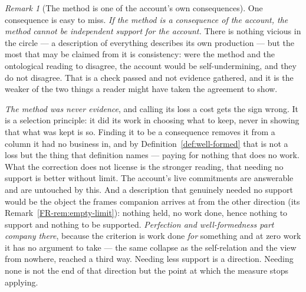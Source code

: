 \documentclass[11pt,a4paper]{article}
\theoremstyle{remark}\newtheorem{remark}[definition]{Remark}
\begin{document}
\begin{remark}[The method is one of the account's own consequences]
One consequence is easy to miss. \emph{If the method is a consequence of the account, the method cannot
be independent support for the account.} There is nothing vicious in the circle --- a description of
everything describes its own production --- but the most that may be claimed from it is consistency:
were the method and the ontological reading to disagree, the account would be self-undermining, and
they do not disagree. That is a check passed and not evidence gathered, and it is the weaker of the two
things a reader might have taken the agreement to show.

\emph{The method was never evidence}, and calling its loss a cost gets the sign wrong. It is a selection principle: it did its work in choosing what to keep, never in showing that
what was kept is so. Finding it to be a consequence removes it from a column it had no business in, and
by Definition~\ref{def:well-formed} that is not a loss but the thing that definition names --- paying
for nothing that does no work. What the correction does not license is the stronger reading, that
needing no support is better without limit. The account's live commitments are answerable and are
untouched by this. And a description that genuinely needed no support would be the object the frames
companion arrives at from the other direction (its Remark~\ref{FR-rem:empty-limit}): nothing held, no work done, hence nothing to support and
nothing to be supported. \emph{Perfection and well-formedness part company there}, because the criterion
is work done \emph{for} something and at zero work it has no argument to take --- the same collapse as
the self-relation and the view from nowhere, reached a third way. Needing less support is a direction.
Needing none is not the end of that direction but the point at which the measure stops applying.
\end{remark}
\end{document}
